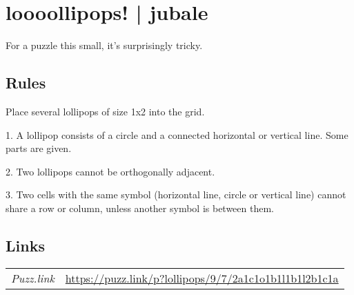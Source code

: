 \section{loooollipops! | {\normalfont jubale}}
\label{sec:55-loooollipops-jubale}
For a puzzle this small, it’s surprisingly tricky.
\subsection*{Rules}
\begin{markdown}
Place several lollipops of size 1x2 into the grid.



1. A lollipop consists of a circle and a connected horizontal or vertical line. Some parts are given.



2. Two lollipops cannot be orthogonally adjacent.



3. Two cells with the same symbol (horizontal line, circle or vertical line) cannot share a row or column, unless another symbol is between them.
\end{markdown}
\subsection*{Links}
\begin{tabularx}{\textwidth}{l X}
\emph{Puzz.link} & \url{https://puzz.link/p?lollipops/9/7/2a1c1o1b1l1b1l2b1c1a} \\
\end{tabularx}
\pagebreak

